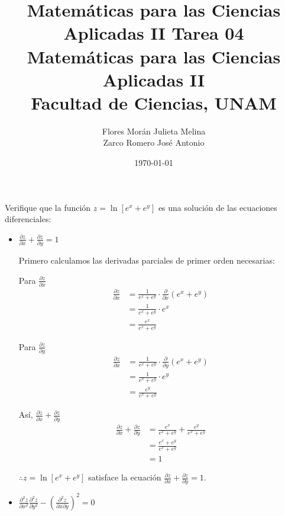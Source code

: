 \documentclass[12pt]{article}
\title{Matemáticas para las Ciencias Aplicadas II}
\title{
  \textbf{Tarea 04} \\
  \vspace{1ex}
  \large Matemáticas para las Ciencias Aplicadas II \\
  Facultad de Ciencias, UNAM}
\date{\today}
\author{Flores Morán Julieta Melina \\ Zarco Romero José Antonio}
\begin{document}
\maketitle

\section{}
Verifique que la función $z = \ln{[e^x + e^y]}$ es una solución de las ecuaciones diferenciales:

\begin{itemize}[format=\textbf]

\item $\frac{\partial z}{\partial x} + \frac{\partial z}{\partial y} = 1$

  Primero calculamos las derivadas parciales de primer orden necesarias:

  Para $\frac{\partial z}{\partial x}$
  \begin{align*}
    \frac{\partial z}{\partial x}
    &= \frac{1}{e^x+e^y} \cdot \frac{\partial}{\partial x} (e^x+e^y) \\
    &= \frac{1}{e^x+e^y} \cdot e^x \\
    &= \frac{e^x}{e^x+e^y}
  \end{align*}

  Para $\frac{\partial z}{\partial y}$
  \begin{align*}
    \frac{\partial z}{\partial x}
    &= \frac{1}{e^x+e^y} \cdot \frac{\partial}{\partial y} (e^x+e^y) \\
    &= \frac{1}{e^x+e^y} \cdot e^y \\
    &= \frac{e^y}{e^x+e^y}
  \end{align*}

  Así, $\frac{\partial z}{\partial x} + \frac{\partial z}{\partial y}$
  \begin{align*}
    \frac{\partial z}{\partial x} + \frac{\partial z}{\partial y} 
    &= \frac{e^x}{e^x+e^y} + \frac{e^y}{e^x+e^y} \\
    &= \frac{e^x + e^y}{e^x+e^y} \\
    &= 1
  \end{align*}

  $\therefore z = \ln{[e^x + e^y]}$ satisface la ecuación $\frac{\partial z}{\partial x} + \frac{\partial z}{\partial y} = 1$.

\item $\frac{\partial^2 z}{\partial x^2} \frac{\partial^2 z}{\partial y^2} - \left( \frac{\partial^2 z}{\partial x \partial y} \right)^2=0$


\end{itemize}
\end{document}
